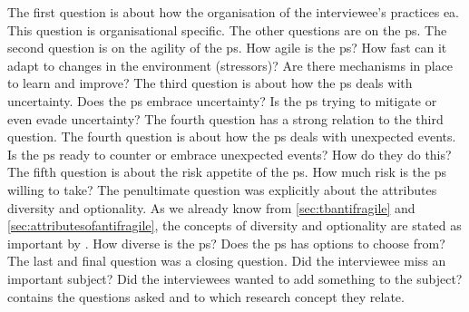 The first question is about how the organisation of the interviewee's practices \acrshort{ea}. This question is organisational specific. The other questions are on the \gls{ps}. The second question is on the agility of the \gls{ps}. How agile is the \gls{ps}? How fast can it adapt to changes in the environment (\glspl{stressor})? Are there mechanisms in place to learn and improve? The third question is about how the \gls{ps} deals with \gls{uncertainty}. Does the \gls{ps} embrace uncertainty? Is the \gls{ps} trying to mitigate or even evade \gls{uncertainty}? The fourth question has a strong relation to the third question. The fourth question is about how the \gls{ps} deals with unexpected events. Is the \gls{ps} ready to counter or embrace unexpected events? How do they do this? The fifth question is about the risk appetite of the \gls{ps}. How much risk is the \gls{ps} willing to take? The penultimate question was explicitly about the \glspl{attribute} \gls{diversity} and \gls{optionality}. As we already know from  \cref{sec:tbantifragile} and \cref{sec:attributesofantifragile}, the concepts of \gls{diversity} and \gls{optionality} are stated as important by \textcites{Taleb2012}{Gorgeon2015}{Botjes2021}. How diverse is the \gls{ps}? Does the \gls{ps} has options to choose from? The last and final question was a closing question. Did the interviewee miss an important subject? Did the interviewees wanted to add something to the subject?  contains the questions asked and to which research concept they relate.

